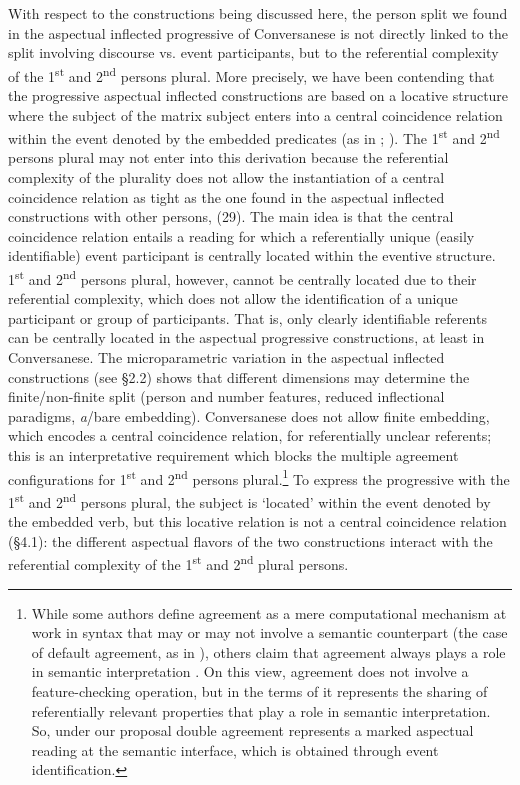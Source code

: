 \documentclass[output=paper]{langsci/langscibook}
\begin{document}
With respect to the constructions being discussed here, the person split we found in the aspectual inflected progressive of Conversanese is not directly linked to the split involving discourse vs. event participants, but to the referential complexity of the 1\textsuperscript{st} and 2\textsuperscript{nd} persons plural. More precisely, we have been contending that the progressive aspectual inflected constructions are based on a locative structure where the subject of the matrix subject enters into a central coincidence relation within the event denoted by the embedded predicates (as in \citealt{Mateu1999}; \citealt{Laka2006}). The 1\textsuperscript{st} and 2\textsuperscript{nd} persons plural may not enter into this derivation because the referential complexity of the plurality does not allow the instantiation of a central coincidence relation as tight as the one found in the aspectual inflected constructions with other persons, (29). The main idea is that the central coincidence relation entails a reading for which a referentially unique (easily identifiable) event participant is centrally located within the eventive structure. 1\textsuperscript{st} and 2\textsuperscript{nd} persons plural, however, cannot be centrally located due to their referential complexity, which does not allow the identification of a unique participant or group of participants. That is, only clearly identifiable referents can be centrally located in the aspectual progressive constructions, at least in Conversanese. The microparametric variation in the aspectual inflected constructions (see §2.2) shows that different dimensions may determine the finite\slash non-finite split (person and number features, reduced inflectional paradigms, \textit{a}/bare embedding). Conversanese does not allow finite embedding, which encodes a central coincidence relation, for referentially unclear referents; this is an interpretative requirement which blocks the multiple agreement configurations for 1\textsuperscript{st} and 2\textsuperscript{nd} persons plural.\footnote{While some authors define agreement as a mere computational mechanism at work in syntax that may or may not involve a semantic counterpart (the case of default agreement, as in \citealt{Preminger2014}), others claim that agreement always plays a role in semantic interpretation \citep{Manzini2007,Manzini2011Bio}. On this view, agreement does not involve a feature{}-checking operation, but in the terms of \citet{Manzini2007} it represents the sharing of referentially relevant properties that play a role in semantic interpretation. So, under our proposal double agreement represents a marked aspectual reading at the semantic interface, which is obtained through event identification.} To express the progressive with the 1\textsuperscript{st} and 2\textsuperscript{nd} persons plural, the subject is ‘located’ within the event denoted by the embedded verb, but this locative relation is not a central coincidence relation (§4.1): the different aspectual flavors of the two constructions interact with the referential complexity of the 1\textsuperscript{st} and 2\textsuperscript{nd} plural persons.
\end{document}
